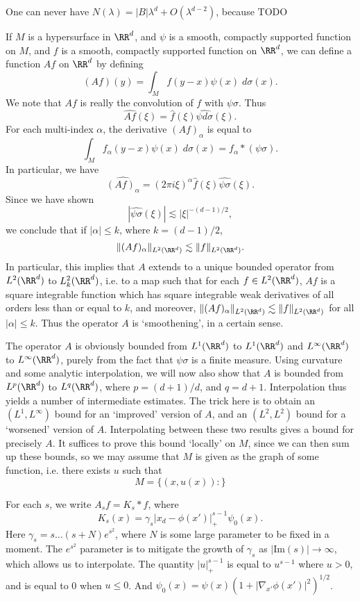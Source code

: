 \begin{remark}
    One can never have $N(\lambda) = |B| \lambda^d + O(\lambda^{d-2})$, because TODO
\end{remark}

\begin{example}
  If $M$ is a hypersurface in $\RR^d$, and $\psi$ is a smooth, compactly supported function on $M$, and $f$ is a smooth, compactly supported function on $\RR^d$, we can define a function $Af$ on $\RR^d$ by defining
  \[ (Af)(y) = \int_M f(y - x) \psi(x)\; d\sigma(x). \]
  We note that $Af$ is really the convolution of $f$ with $\psi \sigma$. Thus
  \[ \widehat{Af}(\xi) = \widehat{f}(\xi) \widehat{\psi d\sigma}(\xi). \]
  For each multi-index $\alpha$, the derivative $(Af)_\alpha$ is equal to
  \[ \int_M f_\alpha(y-x) \psi(x)\; d\sigma(x) = f_\alpha * (\psi \sigma). \]
  In particular, we have
  \[ \widehat{(Af)_\alpha} = (2 \pi i \xi)^\alpha \widehat{f}(\xi) \widehat{\psi \sigma}(\xi). \]
  Since we have shown
  \[ |\widehat{\psi \sigma}(\xi)| \lesssim |\xi|^{-(d-1)/2}, \]
  we conclude that if $|\alpha| \leq k$, where $k = (d-1)/2$,
  \[ \| (Af)_\alpha \|_{L^2(\RR^d)} \lesssim \| f \|_{L^2(\RR^d)}. \]
  In particular, this implies that $A$ extends to a unique bounded operator from $L^2(\RR^d)$ to $L^2_k(\RR^d)$, i.e. to a map such that for each $f \in L^2(\RR^d)$, $Af$ is a square integrable function which has square integrable weak derivatives of all orders less than or equal to $k$, and moreover, $\| (Af)_\alpha \|_{L^2(\RR^d)} \lesssim \| f \|_{L^2(\RR^d)}$ for all $|\alpha| \leq k$. Thus the operator $A$ is `smoothening', in a certain sense.

  The operator $A$ is obviously bounded from $L^1(\RR^d)$ to $L^1(\RR^d)$ and $L^\infty(\RR^d)$ to $L^\infty(\RR^d)$, purely from the fact that $\psi \sigma$ is a finite measure. Using curvature and some analytic interpolation, we will now also show that $A$ is bounded from $L^p(\RR^d)$ to $L^q(\RR^d)$, where $p = (d+1)/d$, and $q = d+1$. Interpolation thus yields a number of intermediate estimates. The trick here is to obtain an $(L^1,L^\infty)$ bound for an `improved' version of $A$, and an $(L^2,L^2)$ bound for a `worsened' version of $A$. Interpolating between these two results gives a bound for precisely $A$. It suffices to prove this bound `locally' on $M$, since we can then sum up these bounds, so we may assume that $M$ is given as the graph of some function, i.e. there exists $u$ such that
  \[ M = \{ (x,u(x)):  \} \]


  For each $s$, we write $A_sf = K_s * f$, where
  \[ K_s(x) = \gamma_s |x_d - \phi(x')|_+^{s-1} \psi_0(x). \]
  Here $\gamma_s = s \dots (s + N) e^{s^2}$, where $N$ is some large parameter to be fixed in a moment. The $e^{s^2}$ parameter is to mitigate the growth of $\gamma_s$ as $|\text{Im}(s)| \to \infty$, which allows us to interpolate. The quantity $|u|_+^{s-1}$ is equal to $u^{s-1}$ where $u > 0$, and is equal to 0 when $u \leq 0$. And $\psi_0(x) = \psi(x) (1 + |\nabla_{x'} \phi(x')|^2)^{1/2}$.
\end{example}





